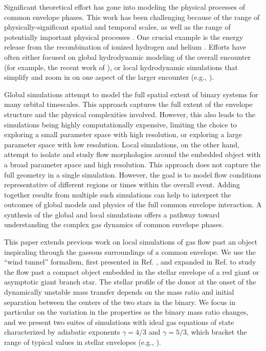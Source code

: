Significant theoretical effort has gone into modeling the physical processes of common envelope phases. This work has been challenging because of the range of physically-significant spatial and temporal scales, as well as the range of potentially important physical processes \cite{1993PASP..105.1373I,2013A&ARv..21...59I}. One crucial example is the energy release from the recombination of ionized hydrogen and helium \cite{Nandez:2015,Ivanova:2016,Lucy:1967,Roxburgh:1967,Han:1994,Han:2002}.  Efforts have often either focused on global hydrodynamic modeling of the overall encounter (for example, the recent work of \cite{Ricker_2007,Passy_2011,Ricker_2012,Ohlmann:2016a,Ohlmann:2016b,Iaconi:2017,Iaconi:2018,Chamandy:2018,Chamandy:2018a,Reichardt:2019,Chamandy:2019psk,Fragos:2019box}), 
or local hydrodynamic simulations that simplify and zoom in on one aspect of the larger encounter (e.g., \cite{Fryxell:1987,Fryxell:1988,Taam:1989,Sandquist_1998,MacLeod_2015,MacLeod:2014yda,MacLeod:2017}). 

Global simulations attempt to model the full spatial extent of binary systems for many orbital timescales. This approach captures the full extent of the envelope structure and the physical complexities involved. However, this also leads to the simulations being highly computationally expensive, limiting the choice to exploring a small parameter space with high resolution, or exploring a large parameter space with low resolution. Local simulations, on the other hand, attempt to isolate and study flow morphologies around the embedded object with a broad parameter space and high resolution. This approach does not capture the full geometry in a single simulation. However, the goal is to model flow conditions representative of different regions or times within the overall event. Adding together results from multiple such simulations can help to interpret the outcomes of global models and physics of the full common envelope interaction.
A synthesis of the global and local simulations offers a pathway toward understanding the complex gas dynamics of common envelope phases.

This paper extends previous work on local simulations of gas flow past an object inspiraling through the gaseous surroundings of a common envelope. We use the ``wind tunnel'' formalism, first presented in Ref. \cite{MacLeod:2014yda}, and expanded in Ref. \cite{MacLeod:2017} to study the flow past a compact object embedded in the stellar envelope of a red giant or asymptotic giant branch star. The stellar profile of the donor at the onset of the dynamically unstable mass transfer depends on the mass ratio and initial separation between the centers of the two stars in the binary. 
We focus in particular on the variation in the properties as the binary mass ratio changes, and we present two suites of simulations with ideal gas equations of state characterized by adiabatic exponents $\gamma = 4/3$ and $\gamma = 5/3$, which bracket the range of typical values in stellar envelopes (e.g., \cite{MacLeod:2017,Murguia-Berthier:2017}).

